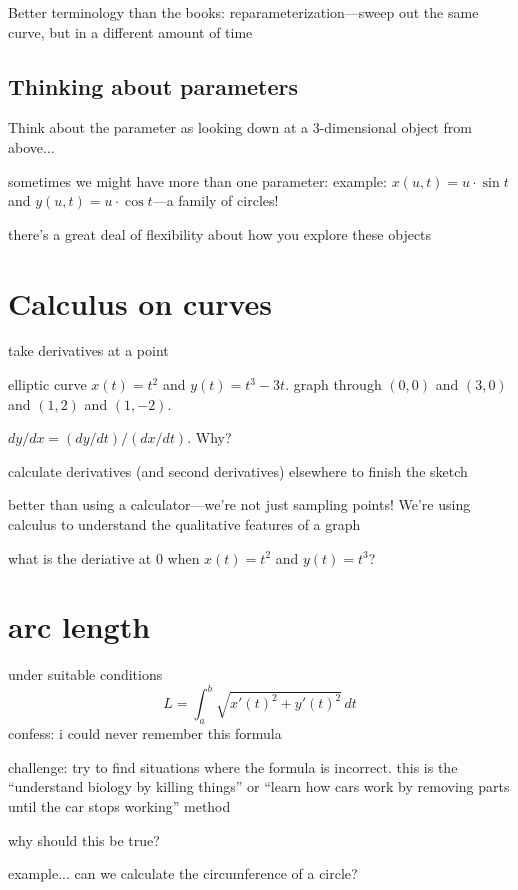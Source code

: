\documentclass[12pt]{article}
\begin{document}
Better terminology than the books: reparameterization---sweep out the same curve, but in a different amount of time

\subsection*{Thinking about parameters}

Think about the parameter as looking down at a 3-dimensional object
from above...

sometimes we might have more than one parameter: example: $x(u,t) = u \cdot \sin t$ and $y(u,t) = u \cdot \cos t$---a family of circles!

there's a great deal of flexibility about how you explore these objects

\section*{Calculus on curves}

take derivatives at a point

elliptic curve $x(t) = t^2$ and $y(t) = t^3 - 3t$.  graph through
$(0,0)$ and $(3,0)$ and $(1,2)$ and $(1,-2)$.

$dy/dx = (dy/dt)/(dx/dt)$.  Why?

calculate derivatives (and second derivatives) elsewhere to finish the sketch

better than using a calculator---we're not just sampling points!  We're using calculus to understand the qualitative features of a graph

what is the deriative at 0 when $x(t) = t^2$ and $y(t) = t^3$?

\section*{arc length}

under suitable conditions
$$
L = \int_a^b \sqrt{ x'(t)^2 + y'(t)^2 } \, dt
$$
confess: i could never remember this formula

challenge: try to find situations where the formula is incorrect.  this is the ``understand biology by killing things'' or ``learn how cars work by removing parts until the car stops working'' method

why should this be true?

example...  can we calculate the circumference of a circle?
\end{document}
